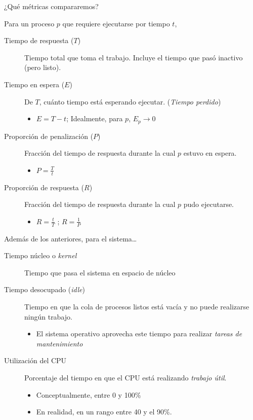 \documentclass[presentation]{beamer}
\begin{document}
\begin{frame}[label={sec:org8a00bb7}]{¿Qué métricas compararemos?}
\begin{center}
Para un proceso \(p\) que requiere ejecutarse por tiempo \(t\),
\end{center}
\begin{description}
\item[{Tiempo de respuesta (\(T\))}] Tiempo total que toma el
trabajo. Incluye el tiempo que pasó inactivo (pero listo).

\item[{Tiempo en espera (\(E\))}] De \(T\), cuánto tiempo está esperando
ejecutar. (\emph{Tiempo perdido})

\begin{itemize}
\item \(E = T - t\); Idealmente, para \(p\), \(E_p \rightarrow 0\)
\end{itemize}

\item[{Proporción de penalización (\(P\))}] Fracción del tiempo de respuesta
durante la cual \(p\) estuvo en espera.
\begin{itemize}
\item \(P = \frac{T}{t}\)
\end{itemize}

\item[{Proporción de respuesta (\(R\))}] Fracción del tiempo
de respuesta durante la cual \(p\) pudo ejecutarse.
\begin{itemize}
\item \(R = \frac{t}{T}\) ; \(R = \frac{1}{P}\)
\end{itemize}
\end{description}
\end{frame}

\begin{frame}[label={sec:orge85eb26}]{Además de los anteriores, para el sistema\ldots{}}
\begin{description}
\item[{Tiempo núcleo o \emph{kernel}}] Tiempo que pasa el sistema en espacio de
núcleo

\item[{Tiempo desocupado (\emph{idle})}] Tiempo en que la cola de procesos
listos está vacía y no puede realizarse ningún trabajo.
\begin{itemize}
\item El sistema operativo aprovecha este tiempo para realizar
\emph{tareas de mantenimiento}
\end{itemize}

\item[{Utilización del CPU}] Porcentaje del tiempo en que el CPU está
realizando \emph{trabajo útil}.
\begin{itemize}
\item Conceptualmente, entre 0 y 100\%
\item En realidad, en un rango entre 40 y el 90\%.
\end{itemize}
\end{description}
\end{frame}
\end{document}
